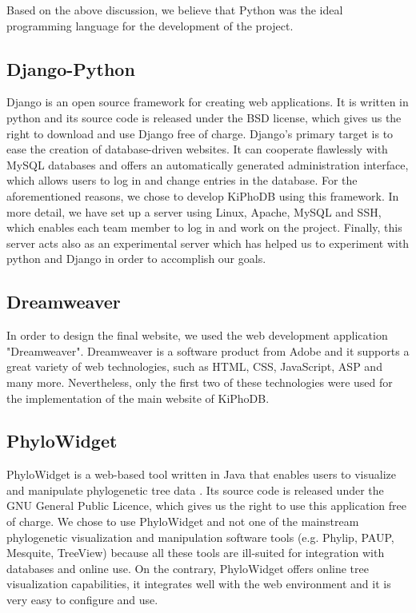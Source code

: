 Based on the above discussion, we believe that Python was the ideal programming language for the development of the project.

\subsection{Django-Python}
Django is an open source framework for creating web applications.
It is written in python and its source code is released under the BSD license, which gives us the right to download and use Django free of charge.
Django's primary target is to ease the creation of database-driven websites.
It can cooperate flawlessly with MySQL databases and offers an automatically generated administration interface, which allows users to log in and
change entries in the database.
For the aforementioned reasons, we chose to develop KiPhoDB using this framework.
In more detail, we have set up a server using Linux, Apache, MySQL and SSH, which enables each team member to log in and work on the project.
Finally, this server acts also as an experimental server which has helped us to experiment with python and Django in order to accomplish our goals.

\subsection{Dreamweaver}
In order to design the final website, we used the web development application "Dreamweaver".
Dreamweaver is a software product from Adobe and it supports a great variety of web technologies, such as HTML, CSS, JavaScript, ASP and many more.
Nevertheless, only the first two of these technologies were used for the implementation of the main website of KiPhoDB.

\subsection{PhyloWidget}
PhyloWidget is a web-based tool written in Java that enables users to visualize and manipulate phylogenetic tree data \cite{PhyloWidget}.
Its source code is released under the GNU General Public Licence, which gives us the right to use this application free of charge.
We chose to use PhyloWidget and not one of the mainstream phylogenetic visualization and manipulation software tools (e.g. Phylip, PAUP, Mesquite, TreeView) because all these tools are ill-suited for integration with databases and online use.
On the contrary, PhyloWidget offers online tree visualization capabilities, it integrates well with the web environment and it is very easy to configure and use.

